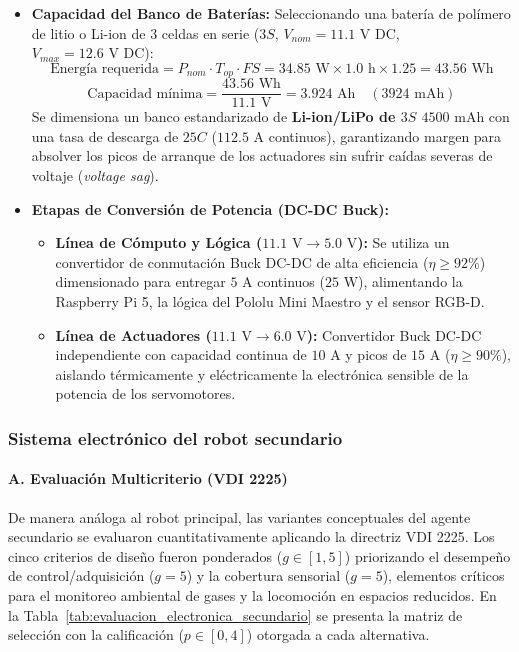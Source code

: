 \begin{itemize}
    \item \textbf{Capacidad del Banco de Baterías:} Seleccionando una batería de polímero de litio o Li-ion de 3 celdas en serie ($3S$, $V_{nom} = 11.1\text{ V DC}$, $V_{max} = 12.6\text{ V DC}$):
    \begin{equation}
        \text{Energía requerida} = P_{nom} \cdot T_{op} \cdot FS = 34.85\text{ W} \times 1.0\text{ h} \times 1.25 = 43.56\text{ Wh}
    \end{equation}
    \begin{equation}
        \text{Capacidad mínima} = \frac{43.56\text{ Wh}}{11.1\text{ V}} = 3.924\text{ Ah} \quad (3924\text{ mAh})
    \end{equation}
    Se dimensiona un banco estandarizado de \textbf{Li-ion/LiPo de $3S$ $4500\text{ mAh}$} con una tasa de descarga de $25C$ ($112.5\text{ A}$ continuos), garantizando margen para absolver los picos de arranque de los actuadores sin sufrir caídas severas de voltaje (\textit{voltage sag}).

    \item \textbf{Etapas de Conversión de Potencia (DC-DC Buck):}
    \begin{itemize}
        \item \textbf{Línea de Cómputo y Lógica ($11.1\text{ V} \to 5.0\text{ V}$):} Se utiliza un convertidor de conmutación Buck DC-DC de alta eficiencia ($\eta \ge 92\%$) dimensionado para entregar $5\text{ A}$ continuos ($25\text{ W}$), alimentando la Raspberry Pi 5, la lógica del Pololu Mini Maestro y el sensor RGB-D.
        \item \textbf{Línea de Actuadores ($11.1\text{ V} \to 6.0\text{ V}$):} Convertidor Buck DC-DC independiente con capacidad continua de $10\text{ A}$ y picos de $15\text{ A}$ ($\eta \ge 90\%$), aislando térmicamente y eléctricamente la electrónica sensible de la potencia de los servomotores.
    \end{itemize}
\end{itemize}


\subsubsection{Sistema electrónico del robot secundario}

\paragraph{A. Evaluación Multicriterio (VDI 2225)}
De manera análoga al robot principal, las variantes conceptuales del agente secundario se evaluaron cuantitativamente aplicando la directriz VDI 2225. Los cinco criterios de diseño fueron ponderados ($g \in [1,5]$) priorizando el desempeño de control/adquisición ($g = 5$) y la cobertura sensorial ($g = 5$), elementos críticos para el monitoreo ambiental de gases y la locomoción en espacios reducidos. En la Tabla~\ref{tab:evaluacion_electronica_secundario} se presenta la matriz de selección con la calificación ($p \in [0,4]$) otorgada a cada alternativa.

